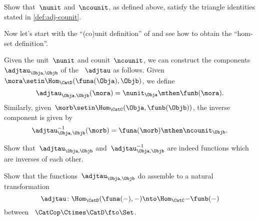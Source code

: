 \begin{solution}
    \missingsolution
\end{solution}

\begin{exercise}
    \label{ex:eta-epsilon-triangle}
    Show that~$\nunit$ and~$\ncounit$, as defined above, satisfy the triangle identities stated in \cref{def:adj-counit}.
\end{exercise}

\begin{solution}
    \missingsolution
\end{solution}

Now let's start with the ``(co)unit definition'' of  and see how to obtain the ``hom-set definition''.

Given the unit~$\nunit$ and counit~$\ncounit$, we can construct the components~$\adjtau_{\Obja,\Objb}$ of the ~$\adjtau$ as follows.
Given~$\mora \setin \Hom_{\CatD}(\funa(\Obja),\Objb)$, we define
\begin{equation}
    \adjtau_{\Obja,\Objb}(\mora) = \nunit_\Obja \mthen \funb(\mora).
\end{equation}
Similarly, given~$\morb \setin \Hom_{\CatC}(\Obja,\funb(\Objb))$, the inverse component is given by
\begin{equation}
    \adjtau_{\Obja,\Objb}^{-1}(\morb) = \funa(\morb) \mthen \ncounit_\Objb.
\end{equation}

\begin{exercise}
    \label{ex:tau}
    Show that~$\adjtau_{\Obja,\Objb}$ and~$\adjtau_{\Obja,\Objb}^{-1}$ are indeed functions which are inverses of each other.
\end{exercise}

\begin{solution}
    \missingsolution
\end{solution}

\begin{exercise}
    \label{ex:tau2}
    Show that the functions~$\adjtau_{\Obja,\Objb}$ do assemble to a natural transformation
    \begin{equation}
        \adjtau \colon \Hom_{\CatD}(\funa(-),- ) \nto \Hom_{\CatC}{-}{\funb(-)}
    \end{equation}
    between ~$\CatCop \Ctimes \CatD \fto \Set $.
\end{exercise}

\begin{solution}
    \missingsolution
\end{solution}
